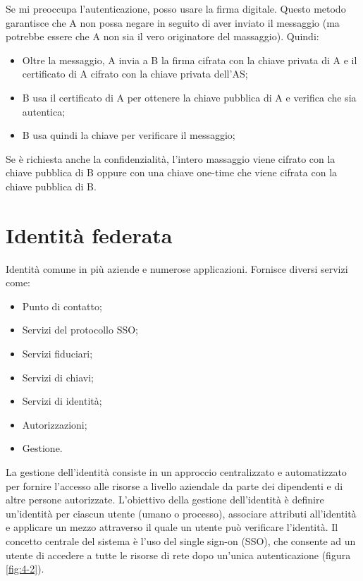 Se mi preoccupa l'autenticazione, posso usare la firma digitale. Questo metodo garantisce che A non possa negare in seguito di aver inviato il messaggio (ma potrebbe essere che A non sia il vero originatore del massaggio). Quindi:
\begin{itemize}
    \item Oltre la messaggio, A invia a B la firma cifrata con la chiave privata di A e il certificato di A cifrato con la chiave privata dell'AS;
	\item B usa il certificato di A per ottenere la chiave pubblica di A e verifica che sia autentica;
	\item B usa quindi la chiave per verificare il messaggio;
\end{itemize}

Se è richiesta anche la confidenzialità, l'intero massaggio viene cifrato con la chiave pubblica di B oppure con una chiave one-time che viene cifrata con la chiave pubblica di B.

\section{Identità federata}
Identità comune in più aziende e numerose applicazioni. Fornisce diversi servizi come:
\begin{itemize}
    \item Punto di contatto;
	\item Servizi del protocollo SSO;
	\item Servizi fiduciari;
	\item Servizi di chiavi;
	\item Servizi di identità;
	\item Autorizzazioni;
	\item Gestione.
\end{itemize}

La gestione dell'identità consiste in un approccio centralizzato e automatizzato per fornire l'accesso alle risorse a livello aziendale da parte dei dipendenti e di altre persone autorizzate. L'obiettivo della gestione dell'identità è definire un'identità per ciascun utente (umano o processo), associare attributi all'identità e applicare un mezzo attraverso il quale un utente può verificare l'identità. Il concetto centrale del sistema è l'uso del single sign-on (SSO), che consente ad un utente di accedere a tutte le risorse di rete dopo un'unica autenticazione (figura \ref{fig:4-2}).

